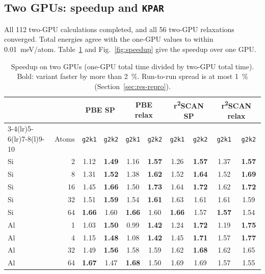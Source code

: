 \documentclass[11pt,letterpaper]{article}
\begin{document}
\subsection{Two GPUs: speedup and \texttt{KPAR}}
\label{sec:res-2gpu}

All 112 two-GPU calculations completed, and all 56 two-GPU relaxations converged. Total energies
agree with the one-GPU values to within \SI{0.01}{meV/atom}. Table~\ref{tab:speedup} and
Fig.~\ref{fig:speedup} give the speedup over one GPU.

\begin{table}[htbp]
\centering
\caption{Speedup on two GPUs (one-GPU total time divided by two-GPU total time). Bold: variant
faster by more than \SI{2}{\percent}. Run-to-run spread is at most \SI{1}{\percent}
(Section~\ref{sec:res-repro}).}
\label{tab:speedup}
\small
\begin{tabular}{@{}lr cc cc cc cc@{}}
\toprule
 & & \multicolumn{2}{c}{PBE SP} & \multicolumn{2}{c}{PBE relax}
 & \multicolumn{2}{c}{r\textsuperscript{2}SCAN SP} & \multicolumn{2}{c}{r\textsuperscript{2}SCAN relax} \\
\cmidrule(lr){3-4}\cmidrule(lr){5-6}\cmidrule(lr){7-8}\cmidrule(l){9-10}
 & Atoms & \texttt{g2k1} & \texttt{g2k2} & \texttt{g2k1} & \texttt{g2k2} & \texttt{g2k1} & \texttt{g2k2} & \texttt{g2k1} & \texttt{g2k2} \\
\midrule
Si & 2 & 1.12 & \textbf{1.49} & 1.16 & \textbf{1.57} & 1.26 & \textbf{1.57} & 1.37 & \textbf{1.57} \\
Si & 8 & 1.31 & \textbf{1.52} & 1.38 & \textbf{1.62} & 1.52 & \textbf{1.64} & 1.52 & \textbf{1.69} \\
Si & 16 & 1.45 & \textbf{1.66} & 1.50 & \textbf{1.73} & 1.64 & \textbf{1.72} & 1.62 & \textbf{1.72} \\
Si & 32 & 1.51 & \textbf{1.59} & 1.54 & \textbf{1.61} & 1.63 & 1.61 & 1.61 & 1.59 \\
Si & 64 & \textbf{1.66} & 1.60 & \textbf{1.66} & 1.60 & \textbf{1.66} & 1.57 & \textbf{1.57} & 1.54 \\
\addlinespace
Al & 1 & 1.03 & \textbf{1.50} & 0.99 & \textbf{1.42} & 1.24 & \textbf{1.72} & 1.19 & \textbf{1.75} \\
Al & 4 & 1.15 & \textbf{1.48} & 1.08 & \textbf{1.42} & 1.45 & \textbf{1.71} & 1.57 & \textbf{1.77} \\
Al & 32 & 1.49 & \textbf{1.56} & 1.58 & 1.59 & 1.62 & \textbf{1.68} & 1.62 & 1.65 \\
Al & 64 & \textbf{1.67} & 1.47 & \textbf{1.68} & 1.50 & 1.69 & 1.69 & 1.57 & 1.55 \\

\end{tabular}
\end{table}
\end{document}
